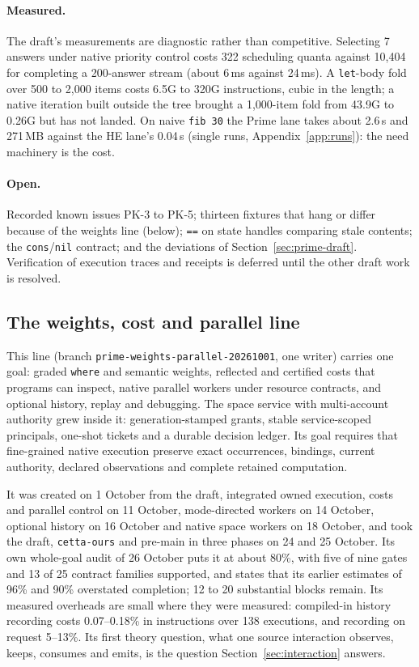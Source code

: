 \documentclass[11pt]{article}
\newcommand{\code}[1]{\texttt{#1}}
\newcommand{\HE}{\textup{HE}}
\begin{document}
\paragraph{Measured.}  The draft's measurements are diagnostic rather than
competitive.  Selecting 7 answers under native priority control costs 322
scheduling quanta against 10{,}404 for completing a 200-answer stream (about
6\,ms against 24\,ms).  A \code{let}-body fold over 500 to 2{,}000 items costs
6.5G to 320G instructions, cubic in the length; a native iteration built outside the
tree brought a 1{,}000-item fold from 43.9G to 0.26G but has not landed.
On naive \code{fib 30} the Prime lane takes about 2.6\,s and 271\,MB
against the \HE{} lane's 0.04\,s (single runs, Appendix~\ref{app:runs}): the
need machinery is the cost.

\paragraph{Open.}  Recorded known issues PK-3 to PK-5; thirteen fixtures that
hang or differ because of the weights line (below); \code{==} on state handles
comparing stale contents; the \code{cons}/\code{nil} contract; and the
deviations of Section~\ref{sec:prime-draft}.  Verification of execution
traces and receipts is deferred until the other draft work is resolved.

\subsection{The weights, cost and parallel line}
\label{sec:line-weights}

This line (branch \code{prime-weights-parallel-20261001}, one writer) carries
one goal: graded \code{where} and semantic weights, reflected and certified
costs that programs can inspect, native parallel workers under resource
contracts, and optional history, replay and debugging.  The space service with
multi-account authority grew inside it: generation-stamped grants, stable
service-scoped principals, one-shot tickets and a durable decision ledger.
Its goal requires that fine-grained native execution preserve exact
occurrences, bindings, current authority, declared observations and complete
retained computation.

It was created on 1 October from the draft, integrated owned execution, costs
and parallel control on 11 October, mode-directed workers on 14 October,
optional history on 16 October and native space workers on 18 October, and
took the draft, \code{cetta-ours} and pre-main in three phases on 24 and
25 October.  Its own whole-goal audit of 26 October puts it at about 80\%,
with five of nine gates and 13 of 25 contract families supported, and states
that its earlier estimates of 96\% and 90\% overstated completion; 12 to 20
substantial blocks remain.  Its measured overheads are small where they were
measured: compiled-in history recording costs 0.07--0.18\% in instructions
over 138 executions, and recording on request 5--13\%.  Its first theory
question, what one source interaction observes, keeps, consumes and emits, is
the question Section~\ref{sec:interaction} answers.
\end{document}
